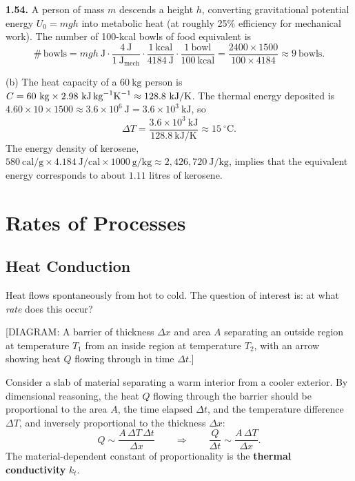 \textbf{1.54.} A person of mass $m$ descends a height $h$, converting gravitational potential energy $U_0 = mgh$ into metabolic heat (at roughly 25\% efficiency for mechanical work). The number of 100-kcal bowls of food equivalent is
\[
    \#\,\text{bowls} = mgh\ \text{J} \cdot \frac{4\ \text{J}}{1\ \text{J}_\text{mech}} \cdot \frac{1\ \text{kcal}}{4184\ \text{J}} \cdot \frac{1\ \text{bowl}}{100\ \text{kcal}}
    = \frac{2400 \times 1500}{100 \times 4184}
    \approx 9\ \text{bowls}.
\]

(b) The heat capacity of a $60\ \text{kg}$ person is $C = 60\ \text{kg} \times 2.98\ \text{kJ\,kg}^{-1}\text{K}^{-1} \approx 128.8\ \text{kJ/K}$. The thermal energy deposited is $4.60 \times 10 \times 1500 \approx 3.6\times10^6\ \text{J} = 3.6\times10^3\ \text{kJ}$, so
\[
    \Delta T = \frac{3.6\times10^3\ \text{kJ}}{128.8\ \text{kJ/K}} \approx 15\ {}^\circ\text{C}.
\]
The energy density of kerosene, $580\ \text{cal/g} \times 4.184\ \text{J/cal} \times 1000\ \text{g/kg} \approx 2{,}426{,}720\ \text{J/kg}$, implies that the equivalent energy corresponds to about $1.11$ litres of kerosene.

\chapter{Rates of Processes}

\section{Heat Conduction}

Heat flows spontaneously from hot to cold. The question of interest is: at what \emph{rate} does this occur?

\begin{center}[DIAGRAM: A barrier of thickness $\Delta x$ and area $A$ separating an outside region at temperature $T_1$ from an inside region at temperature $T_2$, with an arrow showing heat $Q$ flowing through in time $\Delta t$.]\end{center}

Consider a slab of material separating a warm interior from a cooler exterior. By dimensional reasoning, the heat $Q$ flowing through the barrier should be proportional to the area $A$, the time elapsed $\Delta t$, and the temperature difference $\Delta T$, and inversely proportional to the thickness $\Delta x$:
\[
    Q \sim \frac{A\,\Delta T\,\Delta t}{\Delta x}
    \qquad\Longrightarrow\qquad
    \frac{Q}{\Delta t} \sim \frac{A\,\Delta T}{\Delta x}.
\]
The material-dependent constant of proportionality is the \textbf{thermal conductivity} $k_t$.

